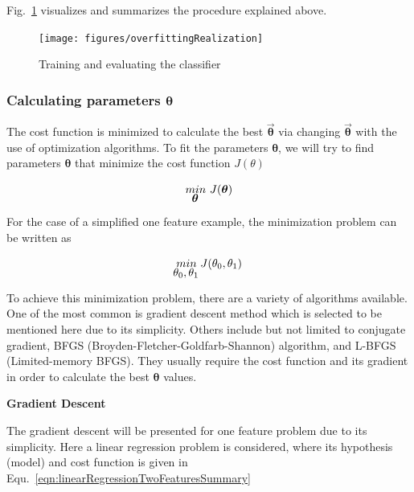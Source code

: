 Fig.~\ref{fig:trainingAndEvaluation} visualizes and summarizes the procedure explained above.

\begin{landscape}
\begin{figure}
\begin{center}
\texttt{[image: figures/overfittingRealization]}    %
\caption{Training and evaluating the classifier} 
\label{fig:trainingAndEvaluation}
\end{center}
\end{figure}
\end{landscape}


\subsubsection{Calculating parameters $\bm{\theta}$}

The cost function is minimized to calculate the best $\vec{\bm{\theta}}$ via changing $\vec{\bm{\theta}}$ with the use of optimization algorithms. To fit the parameters $\bm{\theta}$, we will try to find parameters $\bm{\theta}$ that minimize the cost function $J(\theta)$

\begin{equation}{\label{eqn:optimizationGoal}}
\underaccent{{\displaystyle \bm{\theta}}}{min} \ J(\bm{\theta})
\end{equation} 

For the case of a simplified one feature example, the minimization problem can be written as

\begin{equation}{\label{eqn:optimizationGoalSimplified}}
\underaccent{{\displaystyle \theta_0, \theta_1}}{min} \ J(\theta_0,\theta_1)
\end{equation} 

To achieve this minimization problem, there are a variety of algorithms available. 
One of the most common is gradient descent method which is selected to be mentioned here due to its simplicity.  
Others include but not limited to conjugate gradient, BFGS (Broyden-Fletcher-Goldfarb-Shannon) algorithm, and L-BFGS (Limited-memory BFGS). 
They usually require the cost function and its gradient in order to calculate the best $\bm{\theta}$ values.

\textbf{Gradient Descent}

The gradient descent will be presented for one feature problem due to its simplicity. Here a linear regression problem is considered, where its hypothesis (model) and cost function is given in Equ.~\ref{eqn:linearRegressionTwoFeaturesSummary}

